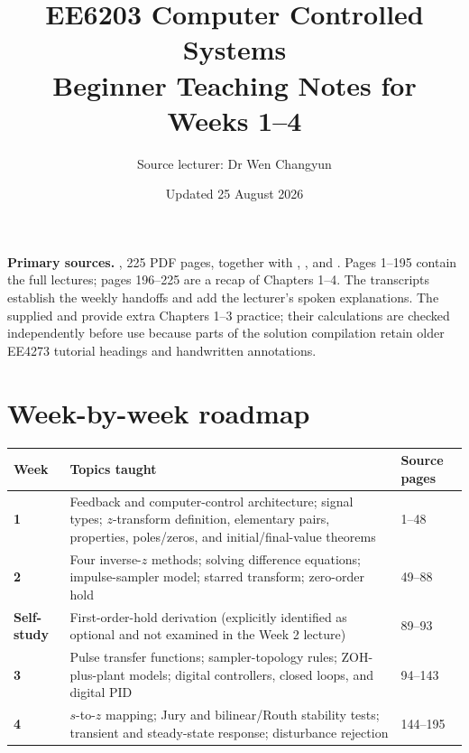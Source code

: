 \documentclass[11pt]{article}
\title{EE6203 Computer Controlled Systems\\\large Beginner Teaching Notes for Weeks 1--4}
\author{Source lecturer: Dr Wen Changyun}
\date{Updated 25 August 2026}
\begin{document}
\maketitle

\textbf{Primary sources.} , 225 PDF pages, together with , , and . Pages 1--195 contain the full lectures; pages 196--225 are a recap of Chapters 1--4. The transcripts establish the weekly handoffs and add the lecturer's spoken explanations. The supplied  and  provide extra Chapters 1--3 practice; their calculations are checked independently before use because parts of the solution compilation retain older EE4273 tutorial headings and handwritten annotations.

\tableofcontents
\newpage

\section*{Week-by-week roadmap}

\begin{center}
\begin{tabular}{>{\bfseries}p{}p{}p{}}
\toprule
Week & Topics taught & Source pages\\
\midrule
1 & Feedback and computer-control architecture; signal types; $z$-transform definition, elementary pairs, properties, poles/zeros, and initial/final-value theorems & 1--48\\
2 & Four inverse-$z$ methods; solving difference equations; impulse-sampler model; starred transform; zero-order hold & 49--88\\
Self-study & First-order-hold derivation (explicitly identified as optional and not examined in the Week 2 lecture) & 89--93\\
3 & Pulse transfer functions; sampler-topology rules; ZOH-plus-plant models; digital controllers, closed loops, and digital PID & 94--143\\
4 & $s$-to-$z$ mapping; Jury and bilinear/Routh stability tests; transient and steady-state response; disturbance rejection & 144--195\\
\bottomrule
\end{tabular}
\end{center}
\end{document}
